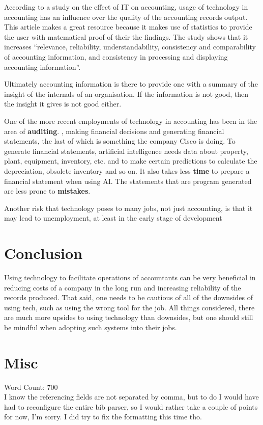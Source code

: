\documentclass{article}
\begin{document}
According to a study \parencite{AbdelraheemAbubkrAhmedElhadi2021Teoi} on the effect of IT on accounting, usage of technology in accounting has an influence over 
the quality of the accounting records output. This article makes a great resource because it makes use of statistics to provide the user with matematical proof of their the findings. 
The study shows that it increases “relevance, reliability, understandability, consistency and comparability 
of accounting information, and consistency in processing and displaying accounting information”.

Ultimately accounting information is there to provide one with a summary of the insight of the internals of an organisation. If the information is not good, 
then the insight it gives is not good either. \parencite{AbdelraheemAbubkrAhmedElhadi2021Teoi}


One of the more recent employments of technology in accounting has been in the area of \textbf{auditing}. \parencite{PetkovRossen2020AiAa}, making financial decisions and 
generating financial statements, the last of which is something the company Cisco is doing. To generate financial statements, artificial intelligence needs data 
about property, plant, equipment, inventory, etc. and to make certain predictions to calculate the depreciation, obsolete inventory and so on.
It also takes less \textbf{time} to prepare a financial statement when using AI.
The statements that are program generated are less prone to \textbf{mistakes}. 

Another risk that technology poses to many jobs, not just accounting, is that it may lead to unemployment, at least in the early stage of development \parencite{MirzaeiAbbasabadiHamed2021Eteo}

\section*{Conclusion}
Using technology to facilitate operations of accountants can be very beneficial in reducing costs of a company in the long run and increasing reliability of the records produced. 
That said, one needs to be cautious of all of the downsides of using tech, such as using the wrong tool for the job. All things considered, there are much more upsides to using technology than downsides, 
but one should still be mindful when adopting such systems into their jobs. \\

\section*{Misc}
Word Count: 700\\
I know the referencing fields are not separated by comma, but to do I would have had to reconfigure the entire bib parser, so I would rather take a couple of points for now, I'm sorry.
I did try to fix the formatting this time tho.

\printbibliography
\end{document}
